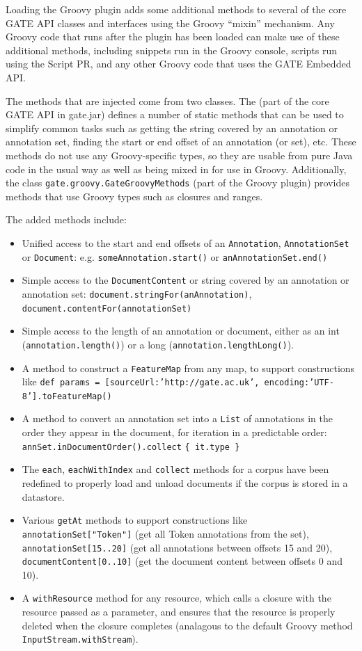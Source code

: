 Loading the Groovy plugin adds some additional methods to several of the core
GATE API classes and interfaces using the Groovy ``mixin'' mechanism.  Any
Groovy code that runs after the plugin has been loaded can make use of these
additional methods, including snippets run in the Groovy console, scripts run
using the Script PR, and any other Groovy code that uses the GATE Embedded API.

The methods that are injected come from two classes.  The
(part of the core GATE API in gate.jar) defines a number of static methods that
can be used to simplify common tasks such as getting the string covered by an
annotation or annotation set, finding the start or end offset of an annotation
(or set), etc.  These methods do not use any Groovy-specific types, so they are
usable from pure Java code in the usual way as well as being mixed in for use
in Groovy.  Additionally, the class \verb|gate.groovy.GateGroovyMethods| (part
of the Groovy plugin) provides methods that use Groovy types such as closures
and ranges.

The added methods include:
\begin{itemize}
\item Unified access to the start and end offsets of an \verb|Annotation|,
  \verb|AnnotationSet| or \verb|Document|: e.g. \verb|someAnnotation.start()|
  or \verb|anAnnotationSet.end()|
\item Simple access to the \verb|DocumentContent| or string covered by an
  annotation or annotation set: \small{\verb|document.stringFor(anAnnotation)|},
  \small{\verb|document.contentFor(annotationSet)|}
\item Simple access to the length of an annotation or document, either as an
  int (\verb|annotation.length()|) or a long (\verb|annotation.lengthLong()|).
\item A method to construct a \verb|FeatureMap| from any map, to support
  constructions like
  \texttt{def params = [sourceUrl:'http://gate.ac.uk',
    encoding:'UTF-8'].toFeatureMap()}
\item A method to convert an annotation set into a \verb|List| of annotations
  in the order they appear in the document, for iteration in a predictable
  order: \verb|annSet.inDocumentOrder().collect| \verb|{ it.type }|
\item The \verb|each|, \verb|eachWithIndex| and \verb|collect| methods for a
  corpus have been redefined to properly load and unload documents if the
  corpus is stored in a datastore.
\item Various \verb|getAt| methods to support constructions like
  \verb|annotationSet["Token"]| (get all Token annotations from the set),
  \verb|annotationSet[15..20]| (get all annotations between offsets 15 and 20),
  \verb|documentContent[0..10]| (get the document content between offsets 0 and
  10).
\item A \verb|withResource| method for any resource, which calls a closure with
  the resource passed as a parameter, and ensures that the resource is properly
  deleted when the closure completes (analagous to the default Groovy method
  \verb|InputStream.withStream|).
\end{itemize}

